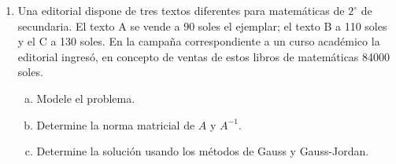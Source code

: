 \documentclass[
	spanish,
	8pt,
	utf8,
	xcolor=table,
	handout,
	aspectratio=169,
	professionalfonts,
	notheorems,
	mathserif,
]{beamer}
\newcounter{savedenum}
\newcommand*{\saveenum}{\setcounter{savedenum}{\theenumi}}
\newcommand*{\resume}{\setcounter{enumi}{\thesavedenum}}
\begin{document}
\begin{frame}
	\begin{enumerate}
		\resume

		\item

		      Una editorial dispone de tres textos diferentes para
		      matemáticas de $2^{\circ}$ de secundaria.
		      El texto A se vende a 90 soles el ejemplar; el texto B a
		      110 soles y el $\mathrm{C}$ a 130 soles.
		      En la campaña correspondiente a un curso académico la
		      editorial ingresó, en concepto de ventas de estos libros de
		      matemáticas 84000 soles.

		      \begin{multicols}{2}
			      \begin{enumerate}[a)]
				      \item
				            Modele el problema.

				      \item

				            Determine la norma matricial de $A$ y $A^{-1}$.
				      \item

				            Determine la solución usando los métodos de Gauss y Gauss-Jordan.
			      \end{enumerate}
		      \end{multicols}
		      \saveenum
	\end{enumerate}
\end{frame}
\end{document}
